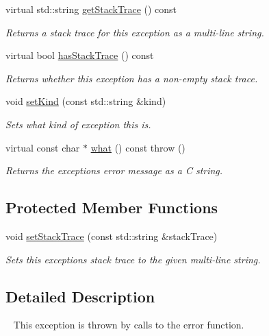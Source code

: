 \begin{DoxyCompactItemize}
virtual std\+::string \mbox{\hyperlink{classErrorException_a79ec2353dbf71c4867c65c6c6df5dfce}{get\+Stack\+Trace}} () const
\begin{DoxyCompactList}\small\item\em Returns a stack trace for this exception as a multi-\/line string. \end{DoxyCompactList}\item 
virtual bool \mbox{\hyperlink{classErrorException_ae7ccac41c27ba02a30bdec527db0a639}{has\+Stack\+Trace}} () const
\begin{DoxyCompactList}\small\item\em Returns whether this exception has a non-\/empty stack trace. \end{DoxyCompactList}\item 
void \mbox{\hyperlink{classErrorException_a896ae13e5a5b1b89f058f7de9697c3cd}{set\+Kind}} (const std\+::string \&kind)
\begin{DoxyCompactList}\small\item\em Sets what kind of exception this is. \end{DoxyCompactList}\item 
virtual const char $\ast$ \mbox{\hyperlink{classErrorException_a8d4b96162e93e11e5816d83702578af8}{what}} () const  throw ()
\begin{DoxyCompactList}\small\item\em Returns the exception\textquotesingle{}s error message as a C string. \end{DoxyCompactList}\end{DoxyCompactItemize}
\subsection*{Protected Member Functions}
\begin{DoxyCompactItemize}
\item 
void \mbox{\hyperlink{classErrorException_aaac5126664da146aa7290235ac7b1d07}{set\+Stack\+Trace}} (const std\+::string \&stack\+Trace)
\begin{DoxyCompactList}\small\item\em Sets this exception\textquotesingle{}s stack trace to the given multi-\/line string. \end{DoxyCompactList}\end{DoxyCompactItemize}


\subsection{Detailed Description}
~\newline
 This exception is thrown by calls to the {\ttfamily error} function. 

